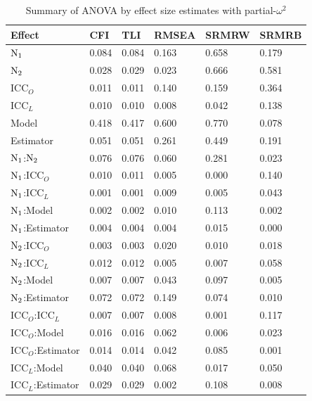 \begin{table}[ht!]
 \centering
 \begin{threeparttable}
 \caption{Summary of ANOVA by effect size estimates with partial-$\omega^2$}
 \label{tb:anova-pomega}
 \begin{tabular}{l C{.75in} C{.75in} C{.75in} C{.75in} C{.75in}}
   \toprule
 Effect & CFI & TLI & RMSEA & SRMRW & SRMRB\\ 
   \midrule
  $\rm N_1$            & 0.084 & 0.084 & 0.163 & 0.658 & 0.179 \\ 
 $\rm N_2$            & 0.028 & 0.029 & 0.023 & 0.666 & 0.581 \\ 
  $\mathrm{ICC}_O$  & 0.011 & 0.011 & 0.140 & 0.159 & 0.364 \\ 
  $\mathrm{ICC}_L$  & 0.010 & 0.010 & 0.008 & 0.042 & 0.138 \\ 
  Model           & 0.418 & 0.417 & 0.600 & 0.770 & 0.078 \\ 
  Estimator        & 0.051 & 0.051 & 0.261 & 0.449 & 0.191 \\ 
  $\rm N_1$:$\rm N_2$      & 0.076 & 0.076 & 0.060 & 0.281 & 0.023 \\ 
  $\rm N_1$:$\mathrm{ICC}_O$      & 0.010 & 0.011 & 0.005 & 0.000 & 0.140 \\ 
  $\rm N_1$:$\mathrm{ICC}_L$     & 0.001 & 0.001 & 0.009 & 0.005 & 0.043 \\ 
  $\rm N_1$:Model      & 0.002 & 0.002 & 0.010 & 0.113 & 0.002 \\ 
  $\rm N_1$:Estimator  & 0.004 & 0.004 & 0.004 & 0.015 & 0.000 \\ 
  $\rm N_2$:$\mathrm{ICC}_O$     & 0.003 & 0.003 & 0.020 & 0.010 & 0.018 \\ 
  $\rm N_2$:$\mathrm{ICC}_L$     & 0.012 & 0.012 & 0.005 & 0.007 & 0.058 \\ 
  $\rm N_2$:Model      & 0.007 & 0.007 & 0.043 & 0.097 & 0.005 \\ 
  $\rm N_2$:Estimator  & 0.072 & 0.072 & 0.149 & 0.074 & 0.010 \\ 
  $\mathrm{ICC}_O$:$\mathrm{ICC}_L$    & 0.007 & 0.007 & 0.008 & 0.001 & 0.117 \\ 
  $\mathrm{ICC}_O$:Model     & 0.016 & 0.016 & 0.062 & 0.006 & 0.023 \\ 
  $\mathrm{ICC}_O$:Estimator & 0.014 & 0.014 & 0.042 & 0.085 & 0.001 \\ 
  $\mathrm{ICC}_L$:Model     & 0.040 & 0.040 & 0.068 & 0.017 & 0.050 \\ 
  $\mathrm{ICC}_L$:Estimator & 0.029 & 0.029 & 0.002 & 0.108 & 0.008 \\ 

\end{tabular}
\end{threeparttable}
\end{table}
